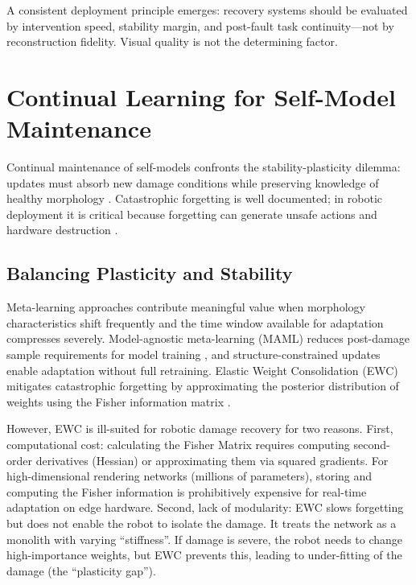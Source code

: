 \documentclass[12pt,a4paper,oneside]{report}
\begin{document}
A consistent deployment principle emerges: recovery systems should be evaluated by intervention speed, stability margin, and post-fault task continuity---not by reconstruction fidelity. Visual quality is not the determining factor.

\section{Continual Learning for Self-Model Maintenance}
\label{sec:continual_learning_lit}

Continual maintenance of self-models confronts the stability-plasticity dilemma: updates must absorb new damage conditions while preserving knowledge of healthy morphology \cite{grossberg1987competitive, mermillod2013stability}. Catastrophic forgetting is well documented; in robotic deployment it is critical because forgetting can generate unsafe actions and hardware destruction \cite{mccloskey1989catastrophic, french1999catastrophic}.

\subsection{Balancing Plasticity and Stability}
Meta-learning approaches contribute meaningful value when morphology characteristics shift frequently and the time window available for adaptation compresses severely. Model-agnostic meta-learning (MAML) reduces post-damage sample requirements for model training \cite{finn2017maml}, and structure-constrained updates enable adaptation without full retraining. Elastic Weight Consolidation (EWC) mitigates catastrophic forgetting by approximating the posterior distribution of weights using the Fisher information matrix \cite{kirkpatrick2017overcoming}.

However, EWC is ill-suited for robotic damage recovery for two reasons. First, computational cost: calculating the Fisher Matrix requires computing second-order derivatives (Hessian) or approximating them via squared gradients. For high-dimensional rendering networks (millions of parameters), storing and computing the Fisher information is prohibitively expensive for real-time adaptation on edge hardware. Second, lack of modularity: EWC slows forgetting but does not enable the robot to isolate the damage. It treats the network as a monolith with varying ``stiffness''. If damage is severe, the robot needs to change high-importance weights, but EWC prevents this, leading to under-fitting of the damage (the ``plasticity gap'').
\end{document}
